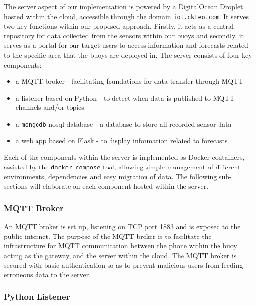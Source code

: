 \documentclass{article}
\begin{document}
\begin{multicols}{2}

The server aspect of our implementation is powered by a DigitalOcean Droplet hosted within the cloud, accessible through the domain \texttt{iot.ckteo.com}. It serves two key functions within our proposed approach. Firstly, it acts as a central repository for data collected from the sensors within our buoys and secondly, it serves as a portal for our target users to access information and forecasts related to the specific area that the buoys are deployed in. The server consists of four key components: 
\begin{itemize}
    \item a MQTT broker - facilitating foundations for data transfer through MQTT
    \item a listener based on Python - to detect when data is published to MQTT channels and/or topics
    \item a \texttt{mongodb} nosql database - a database to store all recorded sensor data
    \item a web app based on Flask - to display information related to forecasts
\end{itemize}

Each of the components within the server is implemented as Docker containers, assisted by the \texttt{docker-compose} tool, allowing simple management of different environments, dependencies and easy migration of data. The following sub-sections will elaborate on each component hosted within the server.

\end{multicols}

\subsubsection{MQTT Broker}

\begin{multicols}{2}

An MQTT broker is set up, listening on TCP port 1883 and is exposed to the public internet. The purpose of the MQTT broker is to facilitate the infrastructure for MQTT communication between the phone within the buoy acting as the gateway, and the server within the cloud. The MQTT broker is secured with basic authentication so as to prevent malicious users from feeding erroneous data to the server.

\end{multicols}

\subsubsection{Python Listener}
\end{document}
